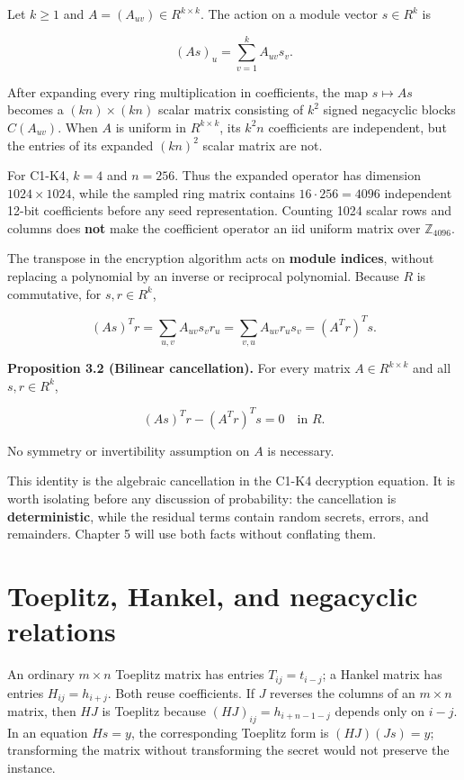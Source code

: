 \documentclass[
  11pt,
  a4paper,
  oneside]{report}
\begin{document}
Let \(k\ge1\) and \(A=(A_{uv})\in R^{k\times k}\). The action on a
module vector \(s\in R^k\) is

\[
(As)_u=\sum_{v=1}^k A_{uv}s_v.
\]

After expanding every ring multiplication in coefficients, the map
\(s\mapsto As\) becomes a \((kn)\times(kn)\) scalar matrix consisting of
\(k^2\) signed negacyclic blocks \(C(A_{uv})\). When \(A\) is uniform in
\(R^{k\times k}\), its \(k^2n\) coefficients are independent, but the
entries of its expanded \((kn)^2\) scalar matrix are not.

For C1-K4, \(k=4\) and \(n=256\). Thus the expanded operator has
dimension \(1024\times1024\), while the sampled ring matrix contains
\(16\cdot256=4096\) independent 12-bit coefficients before any seed
representation. Counting 1024 scalar rows and columns does \textbf{not}
make the coefficient operator an iid uniform matrix over
\(\mathbb Z_{4096}\).

The transpose in the encryption algorithm acts on \textbf{module
indices}, without replacing a polynomial by an inverse or reciprocal
polynomial. Because \(R\) is commutative, for \(s,r\in R^k\),

\[
(As)^Tr
=\sum_{u,v}A_{uv}s_vr_u
=\sum_{v,u}A_{uv}r_us_v
=(A^Tr)^Ts.
\]

\textbf{Proposition 3.2 (Bilinear cancellation).} For every matrix
\(A\in R^{k\times k}\) and all \(s,r\in R^k\),

\[
(As)^Tr-(A^Tr)^Ts=0\quad\text{in }R.
\]

No symmetry or invertibility assumption on \(A\) is necessary.

This identity is the algebraic cancellation in the C1-K4 decryption
equation. It is worth isolating before any discussion of probability:
the cancellation is \textbf{deterministic}, while the residual terms
contain random secrets, errors, and remainders. Chapter 5 will use both
facts without conflating them.

\section{Toeplitz, Hankel, and negacyclic
relations}\label{toeplitz-hankel-and-negacyclic-relations}

An ordinary \(m\times n\) Toeplitz matrix has entries
\(T_{ij}=t_{i-j}\); a Hankel matrix has entries \(H_{ij}=h_{i+j}\). Both
reuse coefficients. If \(J\) reverses the columns of an \(m\times n\)
matrix, then \(HJ\) is Toeplitz because \((HJ)_{ij}=h_{i+n-1-j}\)
depends only on \(i-j\). In an equation \(Hs=y\), the corresponding
Toeplitz form is \((HJ)(Js)=y\); transforming the matrix without
transforming the secret would not preserve the instance.
\end{document}

